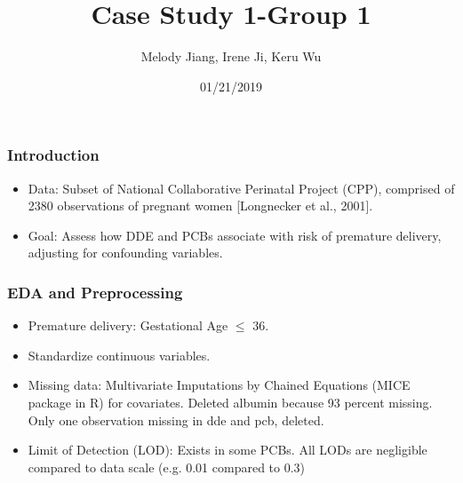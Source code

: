 \documentclass{beamer}
\title{Case Study 1-Group 1}
\author{Melody Jiang, Irene Ji, Keru Wu}
\institute{Department of Statistical Science, Duke University}
\date{01/21/2019}
\begin{document}
\frame{\titlepage}





\begin{frame}
\frametitle{Introduction}

\begin{itemize}
\item Data: Subset of National Collaborative Perinatal Project (CPP), comprised of 2380 observations of pregnant women [Longnecker et al., 2001].
  
\item Goal: Assess how DDE and PCBs associate with risk of premature delivery, adjusting for confounding variables.

\end{itemize}

\end{frame}







\begin{frame}
\frametitle{EDA and Preprocessing}
\begin{itemize}
\item Premature delivery: Gestational Age $\leq$ 36.
\pause
\item Standardize continuous variables.
\pause
\item Missing data: Multivariate Imputations by Chained Equations (MICE package in R) for covariates. Deleted albumin because 93 percent missing. Only one observation missing in dde and pcb, deleted.
\pause
\item Limit of Detection (LOD): Exists in some PCBs. All LODs are negligible compared to data scale (e.g. 0.01 compared to 0.3)
\end{itemize}
\end{frame}
\end{document}
